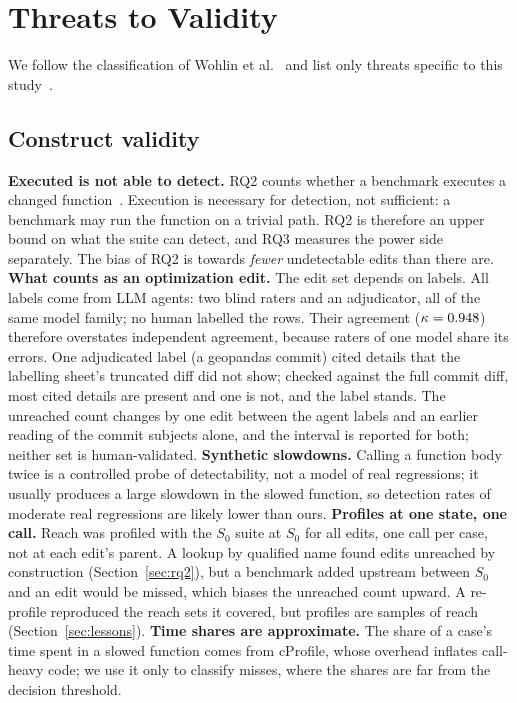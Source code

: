 \section{Threats to Validity}
\label{sec:threats}

We follow the classification of Wohlin et al.~\cite{wohlin2024experimentation} and list only threats specific to this study~\cite{verdecchia2023threats}.

\subsection{Construct validity}
\textbf{Executed is not able to detect.} RQ2 counts whether a benchmark executes a changed function~\cite{sjoberg2022construct}. Execution is necessary for detection, not sufficient: a benchmark may run the function on a trivial path. RQ2 is therefore an upper bound on what the suite can detect, and RQ3 measures the power side separately. The bias of RQ2 is towards \emph{fewer} undetectable edits than there are.
\textbf{What counts as an optimization edit.} The edit set depends on labels. All labels come from LLM agents: two blind raters and an adjudicator, all of the same model family; no human labelled the rows. Their agreement ($\kappa=0.948$) therefore overstates independent agreement, because raters of one model share its errors. One adjudicated label (a geopandas commit) cited details that the labelling sheet's truncated diff did not show; checked against the full commit diff, most cited details are present and one is not, and the label stands. The unreached count changes by one edit between the agent labels and an earlier reading of the commit subjects alone, and the interval is reported for both; neither set is human-validated.
\textbf{Synthetic slowdowns.} Calling a function body twice is a controlled probe of detectability, not a model of real regressions; it usually produces a large slowdown in the slowed function, so detection rates of moderate real regressions are likely lower than ours.
\textbf{Profiles at one state, one call.} Reach was profiled with the $S_0$ suite at $S_0$ for all edits, one call per case, not at each edit's parent. A lookup by qualified name found \ConstructUnreached{} edits unreached by construction (Section~\ref{sec:rq2}), but a benchmark added upstream between $S_0$ and an edit would be missed, which biases the unreached count upward. A re-profile reproduced the reach sets it covered, but profiles are samples of reach (Section~\ref{sec:lessons}).
\textbf{Time shares are approximate.} The share of a case's time spent in a slowed function comes from cProfile, whose overhead inflates call-heavy code; we use it only to classify misses, where the shares are far from the decision threshold.

